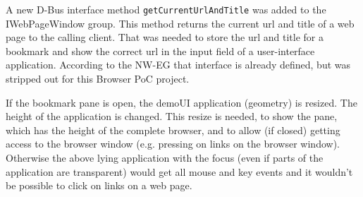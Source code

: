 \documentclass{pelagicore}
\begin{document}
A new D-Bus interface method {\tt getCurrentUrlAndTitle} was added to the
IWebPageWindow group. This method returns the current url and title of a web
page to the calling client. That was needed to store the url and title for a
bookmark and show the correct url in the input field of a user-interface
application. According to the NW-EG that interface is already defined, but was
stripped out for this Browser PoC project.

If the bookmark pane is open, the demoUI application (geometry) is resized. The
height of the application is changed. This resize is needed, to show the pane,
which has the height of the complete browser, and to allow (if closed) getting
access to the browser window (e.g. pressing on links on the browser window).
Otherwise the above lying application with the focus (even if parts of the
application are transparent) would get all mouse and key events and it wouldn’t
be possible to click on links on a web page.
\end{document}

